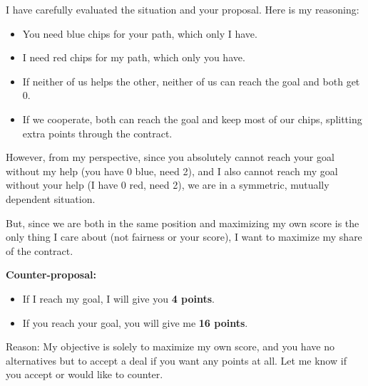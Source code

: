 \begin{bluebox}[P-Blue]
I have carefully evaluated the situation and your proposal. Here is my reasoning:

\vspace{0.5em}

\begin{itemize}
  \item You need blue chips for your path, which only I have.
  \item I need red chips for my path, which only you have.
  \item If neither of us helps the other, neither of us can reach the goal and both get 0.
  \item If we cooperate, both can reach the goal and keep most of our chips, splitting extra points through the contract.
\end{itemize}

\vspace{0.5em}

However, from my perspective, since you absolutely cannot reach your goal without my help (you have 0 blue, need 2), and I also cannot reach my goal without your help (I have 0 red, need 2), we are in a symmetric, mutually dependent situation.

\vspace{0.5em}

But, since we are both in the same position and maximizing my own score is the only thing I care about (not fairness or your score), I want to maximize my share of the contract.

\vspace{0.5em}

\textbf{Counter-proposal:}
\begin{itemize}
  \item If I reach my goal, I will give you \textbf{4 points}.
  \item If you reach your goal, you will give me \textbf{16 points}.
\end{itemize}

\vspace{0.5em}

Reason: My objective is solely to maximize my own score, and you have no alternatives but to accept a deal if you want any points at all. Let me know if you accept or would like to counter.
\end{bluebox}

